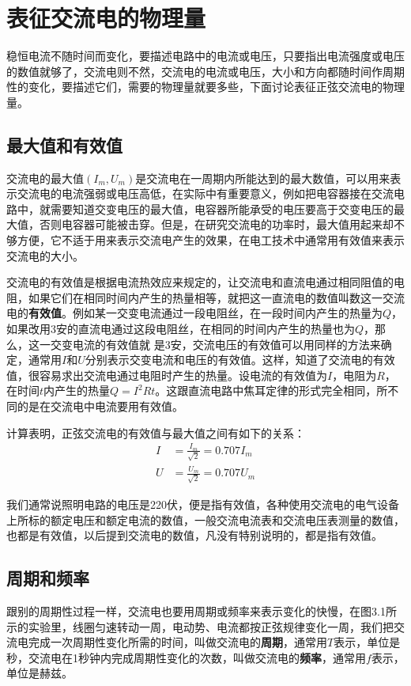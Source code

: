 \section{表征交流电的物理量}

稳恒电流不随时间而变化，要描述电路中的电流或电压，只要指出电流强度或电压的数值就够了，交流电则不然，交流电的电流或电压，大小和方向都随时间作周期性的变化，要描述它们，需要的物理量就要多些，下面讨论表征正弦交流电的物理量。

\subsection{最大值和有效值}

交流电的最大值$(I_m,U_m)$是交流电在一周期内所能达到的最大数值，可以用来表示交流电的电流强弱或电压高低，在实际中有重要意义，例如把电容器接在交流电路中，就需要知道交变电压的最大值，电容器所能承受的电压要高于交变电压的最大值，否则电容器可能被击穿。但是，在研究交流电的功率时，最大值用起来却不够方便，它不适于用来表示交流电产生的效果，在电工技术中通常用有效值来表示交流电的大小。

交流电的有效值是根据电流热效应来规定的，让交流电和直流电通过相同阻值的电阻，如果它们在相同时间内产生的热量相等，就把这一直流电的数值叫数这一交流电的\textbf{有效值}。例如某一交变电流通过一段电阻丝，在一段时间内产生的热量为$Q$，如果改用3安的直流电通过这段电阻丝，在相同的时间内产生的热量也为$Q$，那么，这一交变电流的有效值就
是3安，交流电压的有效值可以用同样的方法来确定，通常用$I$和$U$分别表示交变电流和电压的有效值。这样，知道了交流电的有效值，很容易求出交流电通过电阻时产生的热量。设电流的有效值为$I$，电阻为$R$，在时间$t$内产生的热量$Q=I^2Rt$。这跟直流电路中焦耳定律的形式完全相同，所不同的是在交流电中电流要用有效值。

计算表明，正弦交流电的有效值与最大值之间有如下的关系：
\[\begin{split}
   I&=\frac{I_m}{\sqrt{2}}=0.707I_m\\
   U&=\frac{U_m}{\sqrt{2}}=0.707U_m 
\end{split}\]

我们通常说照明电路的电压是220伏，便是指有效值，各种使用交流电的电气设备上所标的额定电压和额定电流的数值，一般交流电流表和交流电压表测量的数值，也都是有效值，以后提到交流电的数值，凡没有特别说明的，都是指有效值。

\subsection{周期和频率}

跟别的周期性过程一样，交流电也要用周期或频率来表示变化的快慢，在图3.1所示的实验里，线圈匀速转动一周，电动势、电流都按正弦规律变化一周，我们把交流电完成一次周期性变化所需的时间，叫做交流电的\textbf{周期}，通常用$T$表示，单位是秒，交流电在1秒钟内完成周期性变化的次数，叫做交流电的\textbf{频率}，通常用$f$表示，单位是赫兹。

